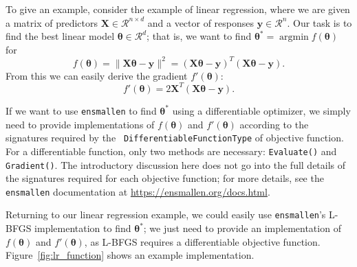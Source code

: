 To give an example, consider the example of linear regression, where we are
given a matrix of predictors $\bm X \in \mathcal{R}^{n \times d}$ and a vector
of responses $\bm y \in \mathcal{R}^n$.  Our task is to find the best linear
model $\bm \theta \in \mathcal{R}^d$; that is, we want to find $\bm \theta^* =
\operatorname{argmin} f(\bm \theta)$ for
\begin{equation}
f(\bm \theta) = \| \bm X \bm \theta - \bm y \|^2 = (\bm X \bm \theta - \bm y)^T
(\bm X \bm \theta - \bm y).
\label{eqn:obj_lr}
\end{equation}
From this we can easily derive the gradient $f'(\bm \theta)$:
\begin{equation}
f'(\bm \theta) = 2 \bm X^T (\bm X \bm \theta - \bm y).
\label{eqn:grad_lr}
\end{equation}

If we want to use {\tt ensmallen} to find $\bm \theta^*$ using a differentiable
optimizer, we simply need to provide implementations of $f(\bm \theta)$ and
$f'(\bm \theta)$ according to the signatures required by the {\tt
DifferentiableFunctionType} of objective function.  For a differentiable
function, only two methods are necessary: {\tt Evaluate()} and {\tt Gradient()}.
The introductory discussion here does not go into the full details of the
signatures required for each objective function; for more details, see the
{\tt ensmallen} documentation at \url{https://ensmallen.org/docs.html}.

Returning to our linear regression example, we could easily use {\tt ensmallen}'s
L-BFGS implementation to find $\bm \theta^*$; we just need to provide an
implementation of $f(\bm \theta)$ and $f'(\bm \theta)$, as L-BFGS requires a
differentiable objective function.  Figure~\ref{fig:lr_function} shows an example
implementation.

